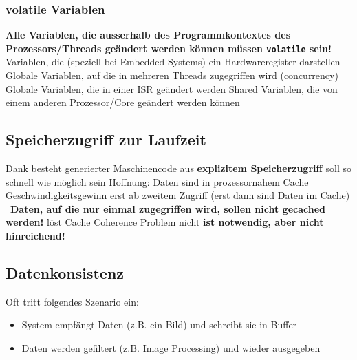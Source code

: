 \subsubsection{volatile Variablen}

\begin{outline}
    \1 \textbf{Alle Variablen, die ausserhalb des Programmkontextes des Prozessors/Threads geändert werden können müssen \lstinline|volatile| sein!}
        \2 Variablen, die (speziell bei Embedded Systems) ein Hardwareregister darstellen
        \2 Globale Variablen, auf die in mehreren Threads zugegriffen wird (concurrency)
        \2 Globale Variablen, die in einer ISR geändert werden
        \2 Shared Variablen, die von einem anderen Prozessor/Core geändert werden können
\end{outline}


\subsection{Speicherzugriff zur Laufzeit}

\begin{outline}
    \1 Dank  besteht generierter Maschinencode aus \textbf{explizitem Speicherzugriff}
        \2 soll so schnell wie möglich sein
        \2 Hoffnung: Daten sind in prozessornahem Cache
    \1 Geschwindigkeitsgewinn erst ab zweitem Zugriff (erst dann sind Daten im Cache) \\
        \textrightarrow\ \textbf{Daten, auf die nur einmal zugegriffen wird, sollen nicht gecached werden!}
    \1  löst Cache Coherence Problem nicht
        \2 \textbf{ ist notwendig, aber nicht hinreichend!}
\end{outline}


\subsection{Datenkonsistenz}

Oft tritt folgendes Szenario ein: 

\vspace{0.1cm}

\begin{itemize}
    \item System empfängt Daten (z.B. ein Bild) und schreibt sie in Buffer
    \item Daten werden gefiltert (z.B. Image Processing) und wieder ausgegeben
\end{itemize}

